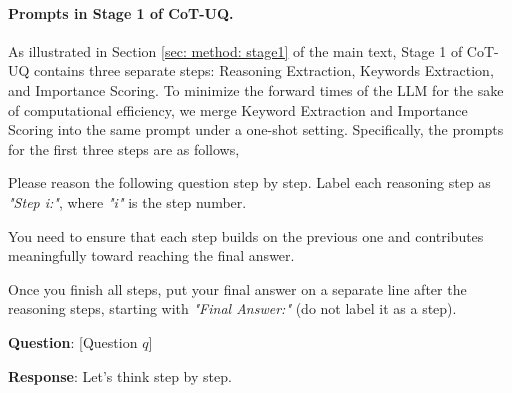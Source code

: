 \documentclass[11pt]{article}
\begin{document}
\paragraph{Prompts in Stage 1 of CoT-UQ.}
As illustrated in Section \ref{sec: method: stage1} of the main text, Stage 1 of CoT-UQ contains three separate steps: Reasoning Extraction, Keywords Extraction, and Importance Scoring. To minimize the forward times of the LLM for the sake of computational efficiency, we merge Keyword Extraction and Importance Scoring into the same prompt under a one-shot setting. Specifically, the prompts for the first three steps are as follows,

\begin{tcolorbox}[
    colframe=black,  %
    colback=white,   %
    rounded corners=north, %
    arc=1mm, %
    boxrule=.4mm, %
    width=\linewidth, %
    coltitle=black, 
    colbacktitle=white,
    title={\textbf{Step 1: Reasoning Extraction}}, %
    fonttitle=\bfseries, %
]

Please reason the following question step by step. Label each reasoning step as \textit{"Step i:"}, where \textit{"i"} is the step number.

You need to ensure that each step builds on the previous one and contributes meaningfully toward reaching the final answer.

Once you finish all steps, put your final answer on a separate line after the reasoning steps, starting with \textit{"Final Answer:"} (do not label it as a step).

\vspace{5pt}

\textbf{Question}: [Question $q$]  

\textbf{Response}: Let's think step by step.

\end{tcolorbox}
\end{document}
